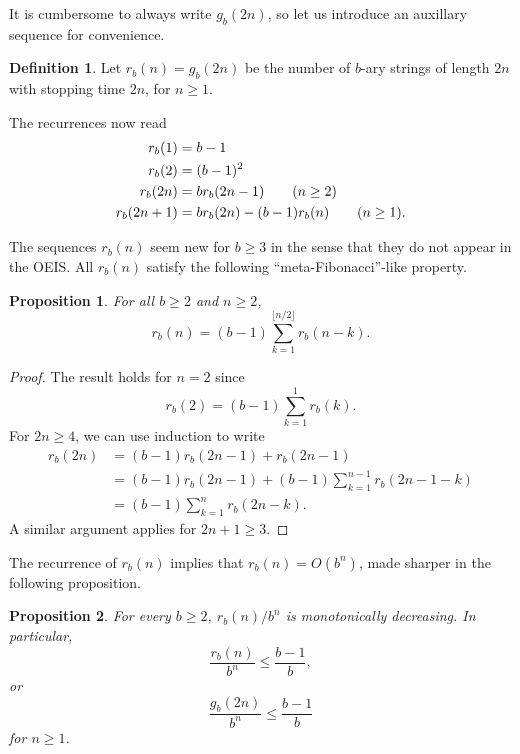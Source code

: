 \documentclass[12pt]{article}
\newtheorem{proposition}{Proposition}
\theoremstyle{definition}
\newtheorem{definition}{Definition}
\begin{document}
It is cumbersome to always write $g_b(2n)$, so let us introduce an auxillary
sequence for convenience.

\begin{definition}
    Let $r_b(n) = g_b(2n)$ be the number of $b$-ary strings of length $2n$ with
    stopping time $2n$, for $n \geq 1$.
\end{definition}

The recurrences now read
\begin{align}
    r_b(1) &= b - 1 \notag \\
    r_b(2) &= (b - 1)^2 \notag \\
    r_b(2n) &= b r_b(2n - 1) \tag{$n \geq 2$} \\
    r_b(2n + 1) &= b r_b(2n) - (b - 1) r_b(n) \tag{$n \geq 1$}.
\end{align}

The sequences $r_b(n)$ seem new for $b \geq 3$ in the sense that they do not
appear in the OEIS. All $r_b(n)$ satisfy the following ``meta-Fibonacci''-like
property.

\begin{proposition}
    For all $b \geq 2$ and $n \geq 2$,
    \begin{equation*}
        r_b(n) = (b - 1) \sum_{k = 1}^{\lfloor n / 2 \rfloor} r_b(n - k).
    \end{equation*}
\end{proposition}

\begin{proof}
    The result holds for $n = 2$ since
    \begin{equation*}
        r_b(2) = (b - 1) \sum_{k = 1}^1 r_b(k).
    \end{equation*}
    For $2n \geq 4$, we can use induction to write
    \begin{align*}
        r_b(2n) &= (b - 1) r_b(2n - 1) + r_b(2n - 1) \\
                &= (b - 1) r_b(2n - 1) + (b - 1) \sum_{k = 1}^{n - 1} r_b(2n - 1 - k) \\
                &= (b - 1) \sum_{k = 1}^n r_b(2n - k).
    \end{align*}
    A similar argument applies for $2n + 1 \geq 3$.
\end{proof}

The recurrence of $r_b(n)$ implies that $r_b(n) = O(b^n)$, made sharper in the
following proposition.

\begin{proposition}
    \label{monotone}
    For every $b \geq 2$, $r_b(n) / b^n$ is monotonically decreasing. In
    particular,
    \begin{equation*}
        \frac{r_b(n)}{b^n} \leq \frac{b - 1}{b},
    \end{equation*}
    or
    \begin{equation*}
        \frac{g_b(2n)}{b^n} \leq \frac{b - 1}{b}
    \end{equation*}
    for $n \geq 1$.
\end{proposition}
\end{document}
